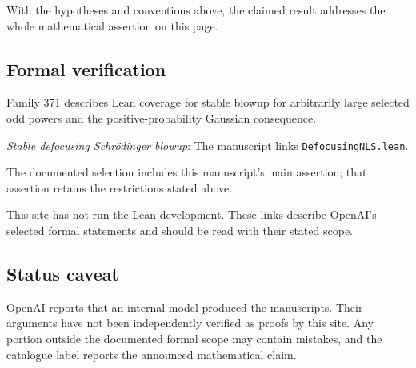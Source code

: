 \documentclass[11pt]{article}
\begin{document}
With the hypotheses and conventions above, the claimed result addresses the whole mathematical assertion on this page.

\subsection{Formal verification}
Family 371 describes Lean coverage for stable blowup for arbitrarily large selected odd powers and the positive-probability Gaussian consequence.

\textit{Stable defocusing Schrödinger blowup}: The manuscript links \texttt{DefocusingNLS.lean}.

The documented selection includes this manuscript’s main assertion; that assertion retains the restrictions stated above.

This site has not run the Lean development. These links describe OpenAI’s selected formal statements and should be read with their stated scope.

\subsection{Status caveat}
OpenAI reports that an internal model produced the manuscripts. Their arguments have not been independently verified as proofs by this site. Any portion outside the documented formal scope may contain mistakes, and the catalogue label reports the announced mathematical claim.
\end{document}
